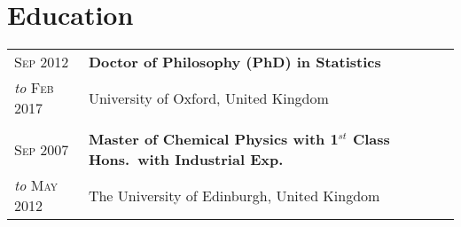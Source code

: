 \section{Education}
\begin{tabular}{>{\raggedleft}p{2.15cm}|p{12cm}}

\textsc{Sep 2012}& \textbf{Doctor of Philosophy (PhD) in Statistics}  \\
\emph{to} \textsc{Feb 2017} & University of Oxford, United Kingdom \\

\multicolumn{2}{c}{}\\

\textsc{Sep 2007}& \textbf{Master of Chemical Physics with 1$^{st}$ Class Hons.~with Industrial Exp.}  \\
\emph{to} \textsc{May 2012} & The University of Edinburgh, United Kingdom \\ 



\end{tabular}
